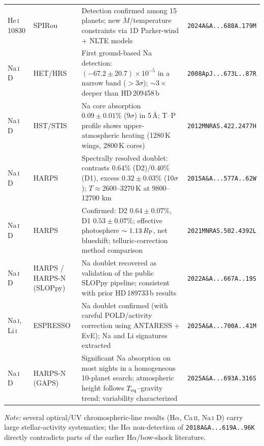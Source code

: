 \begin{longtable}{@{}p{}p{}p{}p{}@{}}
He\,\textsc{i} 10830 &
SPIRou &
Detection confirmed among 15 planets; new $\dot{M}$/temperature constraints via 1D Parker-wind + NLTE models &
\texttt{2024A\&A...688A.179M} \\

Na\,\textsc{i} D &
HET/HRS &
First ground-based Na detection: $(-67.2\pm20.7)\times10^{-5}$ in a narrow band ($>3\sigma$); $\sim3\times$ deeper than HD\,209458\,b &
\texttt{2008ApJ...673L..87R} \\

Na\,\textsc{i} D &
HST/STIS &
Na core absorption $0.09\pm0.01\%$ (9$\sigma$) in 5\,\AA; T--P profile shows upper-atmospheric heating (1280\,K wings, 2800\,K cores) &
\texttt{2012MNRAS.422.2477H} \\

Na\,\textsc{i} D &
HARPS &
Spectrally resolved doublet: contrasts $0.64\%$ (D2)/$0.40\%$ (D1), excess $0.32\pm0.03\%$ (10$\sigma$); $T\approx2600$--$3270$\,K at 9800--12700 km &
\texttt{2015A\&A...577A..62W} \\

Na\,\textsc{i} D &
HARPS &
Confirmed: D2 $0.64\pm0.07\%$, D1 $0.53\pm0.07\%$; effective photosphere $\sim1.13\,R_{\rm P}$, net blueshift; telluric-correction method comparison &
\texttt{2021MNRAS.502.4392L} \\

Na\,\textsc{i} D &
HARPS / HARPS-N (SLOPpy) &
Na doublet recovered as validation of the public SLOPpy pipeline; consistent with prior HD\,189733\,b results &
\texttt{2022A\&A...667A..19S} \\

Na\,\textsc{i}, Li\,\textsc{i} &
ESPRESSO &
Na doublet confirmed (with careful POLD/activity correction using ANTARESS + EvE); Na and Li signatures extracted &
\texttt{2025A\&A...700A..41M} \\

Na\,\textsc{i} D &
HARPS-N (GAPS) &
Significant Na absorption on most nights in a homogeneous 10-planet search; atmospheric height follows $T_{\rm eq}$--gravity trend; variability characterized &
\texttt{2025A\&A...693A.316S} \\

\end{longtable}

\noindent\emph{Note:} several optical/UV chromospheric-line results
(H$\alpha$, Ca\,\textsc{ii}, Na\,\textsc{i} D) carry large stellar-activity
systematics; the H$\alpha$ non-detection of \texttt{2018A\&A...619A..96K}
directly contradicts parts of the earlier H$\alpha$/bow-shock literature.

